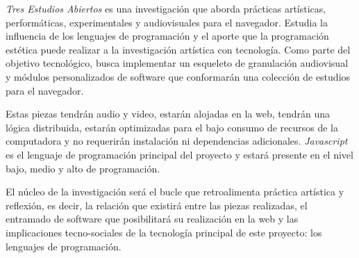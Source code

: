 
\textit{Tres Estudios Abiertos} es una investigación que aborda prácticas artísticas, performáticas, experimentales y audiovisuales para el navegador. Estudia la influencia de los lenguajes de programación y el aporte que la programación estética puede realizar a la investigación artística con tecnología. Como parte del objetivo tecnológico, busca implementar un esqueleto de granulación audiovisual y módulos personalizados de software que conformarán una colección de estudios para el navegador. 


Estas piezas tendrán audio y video, estarán alojadas en la web, tendrán una lógica distribuida, estarán optimizadas para el bajo consumo de recursos de la computadora y no requerirán instalación ni dependencias adicionales. \textit{Javascript} es el lenguaje de programación principal del proyecto y estará presente en el nivel bajo, medio y alto de programación. %

El núcleo de la investigación será el bucle que retroalimenta práctica artística y reflexión, es decir, la relación que existirá entre las piezas realizadas, el entramado de software que posibilitará su realización en la web y las implicaciones tecno-sociales de la tecnología principal de este proyecto: los lenguajes de programación. 
